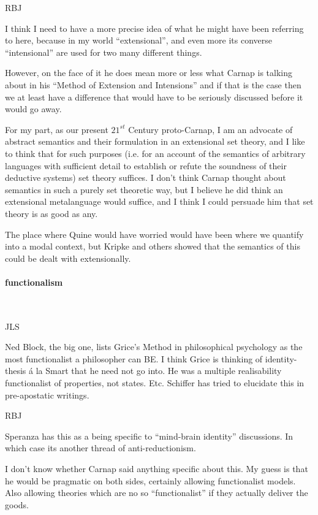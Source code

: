 \documentclass[10pt,titlepage]{book}
\begin{document}
RBJ

I think I need to have a more precise idea of what he might have been referring to here, because in my world ``extensional'', and even more its converse ``intensional'' are used for two many different things.

However, on the face of it he does mean more or less what Carnap is talking about in his ``Method of Extension and Intensions'' and if that is the case then we at least have a difference that would have to be seriously discussed before it would go away.

For my part, as our present $21^{st}$ Century proto-Carnap, I am an advocate of abstract semantics and their formulation in an extensional set theory, and I like to think that for such purposes (i.e. for an account of the semantics of arbitrary languages with sufficient detail to establish or refute the soundness of their deductive systems) set theory suffices.
I don't think Carnap thought about semantics in such a purely set theoretic way, but I believe he did think an extensional metalanguage would suffice, and I think I could persuade him that set theory is as good as any.

The place where Quine would have worried would have been where we quantify into a modal context, but Kripke and others showed that the semantics of this could be dealt with extensionally.

\paragraph{functionalism}\ 

JLS

Ned Block, the big one, lists Grice's Method in  
philosophical psychology as the most functionalist a philosopher can BE.
I think  Grice is thinking of identity-thesis \'a la Smart that he need not go into.
He was a multiple realisability functionalist of properties, not states. Etc. 
Schiffer has tried to elucidate this in pre-apostatic writings.

RBJ

Speranza has this as a being specific to ``mind-brain identity'' discussions.
In which case its another thread of anti-reductionism.

I don't know whether Carnap said anything specific about this.
My guess is that he would be pragmatic on both sides, certainly allowing functionalist models.
Also allowing theories which are no so ``functionalist'' if they actually deliver the goods.
\end{document}

